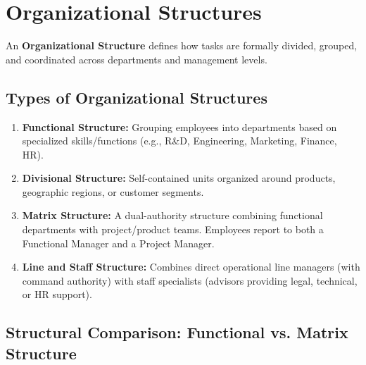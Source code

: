 \documentclass[11pt,a4paper]{article}
\begin{document}
\section{Organizational Structures}

An \textbf{Organizational Structure} defines how tasks are formally divided, grouped, and coordinated across departments and management levels.

\subsection{Types of Organizational Structures}

\begin{enumerate}[leftmargin=*, itemsep=5pt]
  \item \textbf{Functional Structure:} Grouping employees into departments based on specialized skills/functions (e.g., R\&D, Engineering, Marketing, Finance, HR).
  \item \textbf{Divisional Structure:} Self-contained units organized around products, geographic regions, or customer segments.
  \item \textbf{Matrix Structure:} A dual-authority structure combining functional departments with project/product teams. Employees report to both a Functional Manager and a Project Manager.
  \item \textbf{Line and Staff Structure:} Combines direct operational line managers (with command authority) with staff specialists (advisors providing legal, technical, or HR support).
\end{enumerate}

\subsection{Structural Comparison: Functional vs. Matrix Structure}
\end{document}
